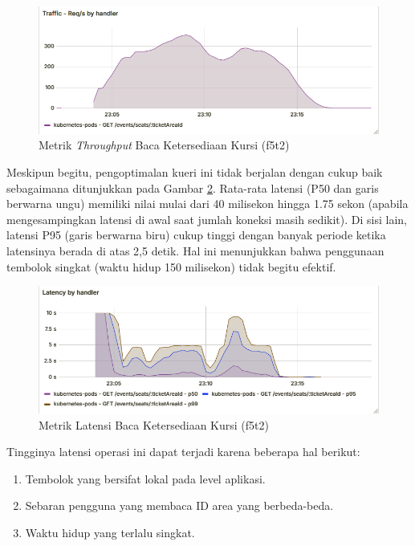 \begin{figure}[H]
    \centering
    \includegraphics[width=1\textwidth]{resources/chapter-4/throughput-seat-availability.png}
    \caption{Metrik \textit{Throughput} Baca Ketersediaan Kursi (f5t2)}
    \label{fig:throughput-get-seat}
\end{figure}

Meskipun begitu, pengoptimalan kueri ini tidak berjalan dengan cukup baik sebagaimana ditunjukkan pada Gambar \ref{fig:latency-get-seat}. Rata-rata latensi (P50 dan garis berwarna ungu) memiliki nilai mulai dari 40 milisekon hingga 1.75 sekon (apabila mengesampingkan latensi di awal saat jumlah koneksi masih sedikit). Di sisi lain, latensi P95 (garis berwarna biru) cukup tinggi dengan banyak periode ketika latensinya berada di atas  2,5 detik. Hal ini menunjukkan bahwa penggunaan tembolok singkat (waktu hidup 150 milisekon) tidak begitu efektif.

\begin{figure}[H]
    \centering
    \includegraphics[width=1\textwidth]{resources/chapter-4/latency-seat-availability.png}
    \caption{Metrik Latensi Baca Ketersediaan Kursi (f5t2)}
    \label{fig:latency-get-seat}
\end{figure}

Tingginya latensi operasi ini dapat terjadi karena beberapa hal berikut:

\begin{enumerate}
    \item Tembolok yang bersifat lokal pada level aplikasi.
    \item Sebaran pengguna yang membaca ID area yang berbeda-beda.
    \item Waktu hidup yang terlalu singkat.
\end{enumerate}

